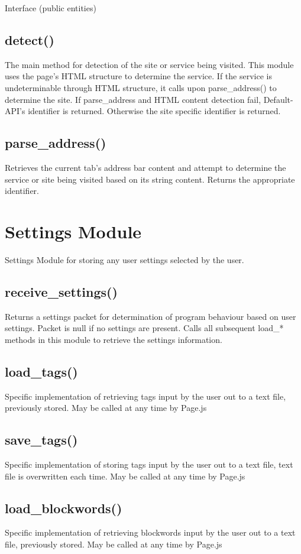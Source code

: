 \documentclass[12pt, titlepage]{article}
\begin{document}
Interface (public entities)
\subsection{detect()}
The main method for detection of the site or service being visited. This module uses the page's HTML structure to determine the service. If the service is undeterminable through HTML structure, it calls upon parse\_address() to determine the site. If parse\_address and HTML content detection fail, Default-API's identifier is returned. Otherwise the site specific identifier is returned.
\subsection{parse\_address()}
Retrieves the current tab's address bar content and attempt to determine the service or site being visited based on its string content. Returns the appropriate identifier.

\section{Settings Module}
Settings Module for storing any user settings selected by the user.
\subsection{receive\_settings()}
Returns a settings packet for determination of program behaviour based on user settings. Packet is null if no settings are present. Calls all subsequent load\_* methods in this module to retrieve the settings information.
\subsection{load\_tags()}
Specific implementation of retrieving tags input by the user out to a text file, previously stored. May be called at any time by Page.js
\subsection{save\_tags()}
Specific implementation of storing tags input by the user out to a text file, text file is overwritten each time. May be called at any time by Page.js
\subsection{load\_blockwords()}
Specific implementation of retrieving blockwords input by the user out to a text file, previously stored. May be called at any time by Page.js
\end{document}
